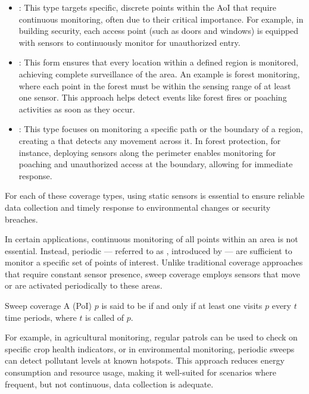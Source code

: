 \documentclass[a4paper, 12pt]{report}
\begin{document}
    \begin{itemize}
        \item {}: This type targets specific, discrete points within the AoI that require continuous monitoring, often due to their critical importance. For example, in building security, each access point (such as doors and windows) is equipped with sensors to continuously monitor for unauthorized entry.
        \item {}: This form ensures that every location within a defined region is monitored, achieving complete surveillance of the area. An example is forest monitoring, where each point in the forest must be within the sensing range of at least one sensor. This approach helps detect events like forest fires or poaching activities as soon as they occur.
        \item {}: This type focuses on monitoring a specific path or the boundary of a region, creating a  that detects any movement across it. In forest protection, for instance, deploying sensors along the perimeter enables monitoring for poaching and unauthorized access at the boundary, allowing for immediate response.
    \end{itemize}

    For each of these coverage types,  using static sensors is essential to ensure reliable data collection and timely response to environmental changes or security breaches.

    In certain applications, continuous monitoring of all points within an area is not essential. Instead, periodic  --- referred to as , introduced by \textcite{cheng2} --- are sufficient to monitor a specific set of points of interest. Unlike traditional coverage approaches that require constant sensor presence, sweep coverage employs sensors that move or are activated periodically to  these areas. 

    \begin{frameddefn}{Sweep coverage}
        A  (PoI) $p$ is said to be  if and only if  at least one  visits $p$ every $t$ time periods, where $t$ is called  of $p$.
    \end{frameddefn}

    For example, in agricultural monitoring, regular patrols can be used to check on specific crop health indicators, or in environmental monitoring, periodic sweeps can detect pollutant levels at known hotspots. This approach reduces energy consumption and resource usage, making it well-suited for scenarios where frequent, but not continuous, data collection is adequate.
\end{document}
